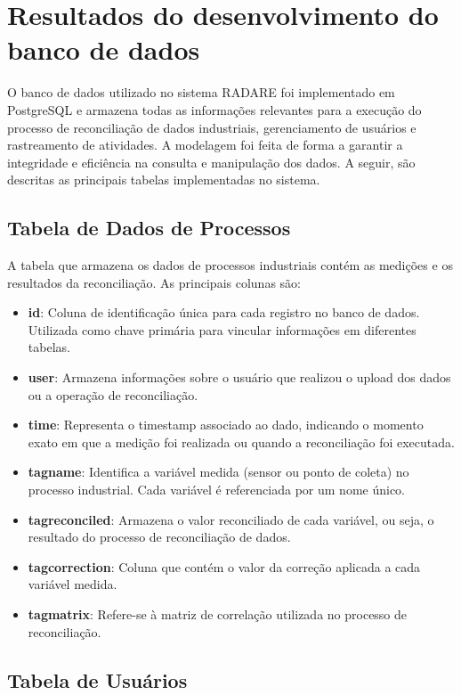 \section{Resultados do desenvolvimento do banco de dados}

O banco de dados utilizado no sistema RADARE foi implementado em PostgreSQL e armazena todas as informações relevantes para a execução do processo de reconciliação de dados industriais, gerenciamento de usuários e rastreamento de atividades. A modelagem foi feita de forma a garantir a integridade e eficiência na consulta e manipulação dos dados. A seguir, são descritas as principais tabelas implementadas no sistema.

\subsection{Tabela de Dados de Processos}

A tabela que armazena os dados de processos industriais contém as medições e os resultados da reconciliação. As principais colunas são:

\begin{itemize}
    \item \textbf{id}: Coluna de identificação única para cada registro no banco de dados. Utilizada como chave primária para vincular informações em diferentes tabelas.
    \item \textbf{user}: Armazena informações sobre o usuário que realizou o upload dos dados ou a operação de reconciliação.
    \item \textbf{time}: Representa o timestamp associado ao dado, indicando o momento exato em que a medição foi realizada ou quando a reconciliação foi executada.
    \item \textbf{tagname}: Identifica a variável medida (sensor ou ponto de coleta) no processo industrial. Cada variável é referenciada por um nome único.
    \item \textbf{tagreconciled}: Armazena o valor reconciliado de cada variável, ou seja, o resultado do processo de reconciliação de dados.
    \item \textbf{tagcorrection}: Coluna que contém o valor da correção aplicada a cada variável medida.
    \item \textbf{tagmatrix}: Refere-se à matriz de correlação utilizada no processo de reconciliação.
\end{itemize}

\subsection{Tabela de Usuários}

